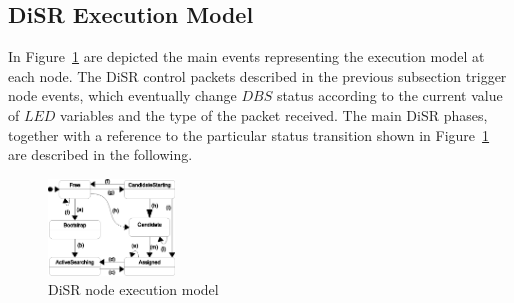 \subsection{DiSR Execution Model}

In Figure~\ref{fig:state_machine} are depicted the main events
representing the execution model at each node. The DiSR control
packets described in the previous subsection trigger node events,
which eventually change $DBS$ status according to the current value of
$LED$ variables and the type of the packet received. The main DiSR
phases, together with a reference to the particular status transition
shown in Figure~\ref{fig:state_machine} are described in the
following.

\begin{figure}
  \centering
    \includegraphics[width=0.30\textwidth]{pictures/state_machine.eps}
  \caption{DiSR node execution model}
  \label{fig:state_machine}
\end{figure}
